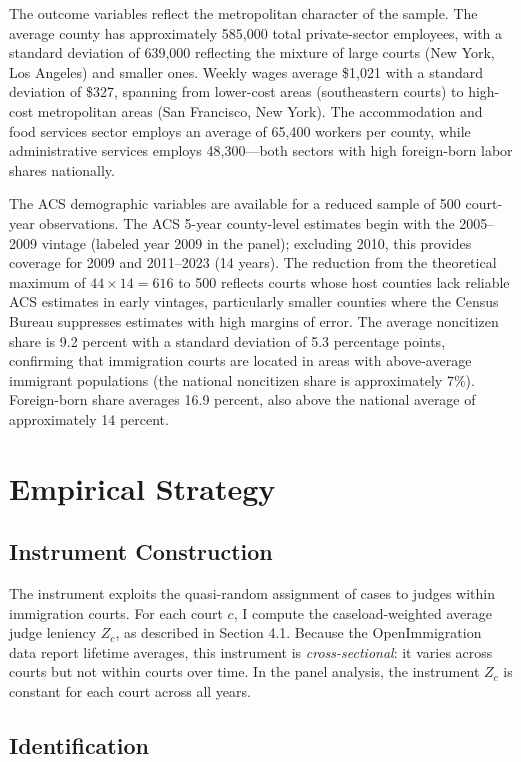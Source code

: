 \documentclass[12pt]{article}
\begin{document}
The outcome variables reflect the metropolitan character of the sample. The average county has approximately 585,000 total private-sector employees, with a standard deviation of 639,000 reflecting the mixture of large courts (New York, Los Angeles) and smaller ones. Weekly wages average \$1,021 with a standard deviation of \$327, spanning from lower-cost areas (southeastern courts) to high-cost metropolitan areas (San Francisco, New York). The accommodation and food services sector employs an average of 65,400 workers per county, while administrative services employs 48,300---both sectors with high foreign-born labor shares nationally.

The ACS demographic variables are available for a reduced sample of 500 court-year observations. The ACS 5-year county-level estimates begin with the 2005--2009 vintage (labeled year 2009 in the panel); excluding 2010, this provides coverage for 2009 and 2011--2023 (14 years). The reduction from the theoretical maximum of $44 \times 14 = 616$ to 500 reflects courts whose host counties lack reliable ACS estimates in early vintages, particularly smaller counties where the Census Bureau suppresses estimates with high margins of error. The average noncitizen share is 9.2 percent with a standard deviation of 5.3 percentage points, confirming that immigration courts are located in areas with above-average immigrant populations (the national noncitizen share is approximately 7\%). Foreign-born share averages 16.9 percent, also above the national average of approximately 14 percent.


\section{Empirical Strategy}

\subsection{Instrument Construction}

The instrument exploits the quasi-random assignment of cases to judges within immigration courts. For each court $c$, I compute the caseload-weighted average judge leniency $Z_c$, as described in Section 4.1. Because the OpenImmigration data report lifetime averages, this instrument is \textit{cross-sectional}: it varies across courts but not within courts over time. In the panel analysis, the instrument $Z_c$ is constant for each court across all years.

\subsection{Identification}
\end{document}
